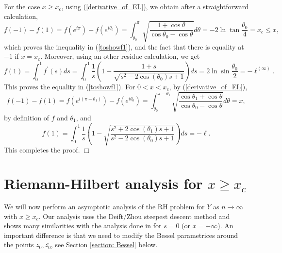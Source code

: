 \documentclass[11pt,fleqn]{article}
\numberwithin{equation}{section}
\newenvironment{proof}%
    {\rm \trivlist \item[\hskip \labelsep{\bf Proof. }]}%
    {\hspace*{\fill}$\Box$\endtrivlist}
\begin{document}
\begin{proof}
For the case $x\geq x_c$, using  (\ref{derivative_of_EL}), we obtain after a straightforward calculation, \begin{equation*}
f(-1) - f(1) =f(e^{i\pi})-f(e^{i\theta_0})= \int_{\theta_0}^{\pi} \sqrt{\frac{1+\cos \theta}{\cos \theta_{0} - \cos \theta}}d\theta= -2 \ln \tan \frac{\theta_{0}}{4} = x_c \leq x,
\end{equation*}
which proves the inequality in (\ref{toshowf1}), and the fact that there is equality at $-1$ if $x=x_c$.
Moreover, using an other residue calculation, we get
\begin{equation*}
f(1) = \int_{0}^{1} f^{\prime}(s) ds = \int_{0}^{1} \frac{1}{s}\left( 1 - \frac{1+s}{\sqrt{s^{2}-2\cos (\theta_{0})s + 1}} \right)ds = 2\ln \sin \frac{\theta_{0}}{2} = -\ell^{(\infty)}.
\end{equation*}
This proves the equality in (\ref{toshowf1}).
For $0 < x < x_{c}$, by
(\ref{derivative_of_EL}), 
\begin{equation*}
f(-1) - f(1) =f(e^{i(\pi-\theta_1)})-f(e^{i\theta_0})= \int_{\theta_0}^{\pi-\theta_1} \sqrt{\frac{\cos\theta_1+\cos \theta}{\cos \theta_{0} - \cos \theta}}d\theta = x,
\end{equation*}
by definition of $f$ and $\theta_{1}$,
and 
\begin{equation*}
f(1)= \int_{0}^{1} \frac{1}{s}\left( 1 - \sqrt{\frac{s^2 + 2\cos (\theta_{1}) s +1}{s^2 - 2\cos (\theta_{0}) s +1}} \right) ds = -\ell.
\end{equation*}
This completes the proof.
\end{proof}






\section{Riemann-Hilbert analysis for $x\geq x_c$}\label{section: RH}
We will now perform an asymptotic analysis of the RH problem for $Y$ as $n\to\infty$ with $x\geq x_c$. Our analysis uses the Deift/Zhou steepest descent method \cite{Deift, DKMVZ2, DKMVZ1} and shows many similarities with the analysis done in \cite{Krasovsky} for $s=0$ (or $x=+\infty$). An important difference is that we need to modify the Bessel parametrices around the points $z_0, \overline{z_0}$, see Section \ref{section: Bessel} below.
\end{document}
